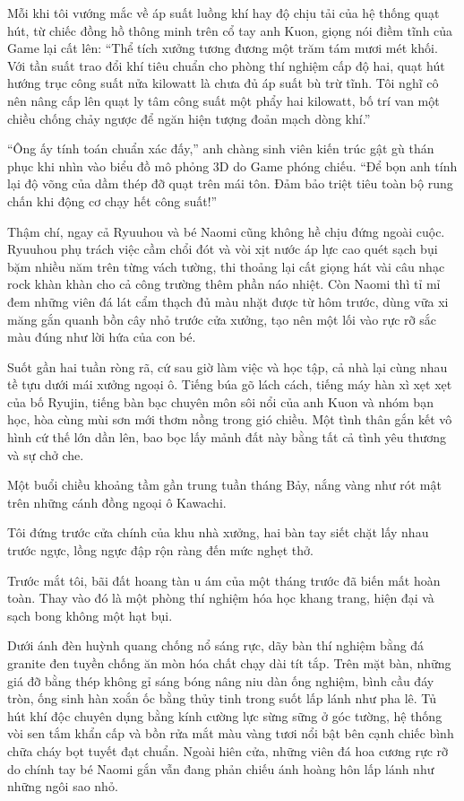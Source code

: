 \documentclass[../main.tex]{subfiles}
\begin{document}
Mỗi khi tôi vướng mắc về áp suất luồng khí hay độ chịu tải của hệ thống quạt hút, từ chiếc đồng hồ thông minh trên cổ tay anh Kuon, giọng nói điềm tĩnh của Game lại cất lên: ``Thể tích xưởng tương đương một trăm tám mươi mét khối. Với tần suất trao đổi khí tiêu chuẩn cho phòng thí nghiệm cấp độ hai, quạt hút hướng trục công suất nửa kilowatt là chưa đủ áp suất bù trừ tĩnh. Tôi nghĩ cô nên nâng cấp lên quạt ly tâm công suất một phẩy hai kilowatt, bố trí van một chiều chống chảy ngược để ngăn hiện tượng đoản mạch dòng khí.''

``Ông ấy tính toán chuẩn xác đấy,'' anh chàng sinh viên kiến trúc gật gù thán phục khi nhìn vào biểu đồ mô phỏng 3D do Game phóng chiếu. ``Để bọn anh tính lại độ võng của dầm thép đỡ quạt trên mái tôn. Đảm bảo triệt tiêu toàn bộ rung chấn khi động cơ chạy hết công suất!''

Thậm chí, ngay cả Ryuuhou và bé Naomi cũng không hề chịu đứng ngoài cuộc. Ryuuhou phụ trách việc cầm chổi đót và vòi xịt nước áp lực cao quét sạch bụi bặm nhiều năm trên từng vách tường, thi thoảng lại cất giọng hát vài câu nhạc rock khàn khàn cho cả công trường thêm phần náo nhiệt. Còn Naomi thì tỉ mỉ đem những viên đá lát cẩm thạch đủ màu nhặt được từ hôm trước, dùng vữa xi măng gắn quanh bồn cây nhỏ trước cửa xưởng, tạo nên một lối vào rực rỡ sắc màu đúng như lời hứa của con bé.

Suốt gần hai tuần ròng rã, cứ sau giờ làm việc và học tập, cả nhà lại cùng nhau tề tựu dưới mái xưởng ngoại ô. Tiếng búa gõ lách cách, tiếng máy hàn xì xẹt xẹt của bố Ryujin, tiếng bàn bạc chuyên môn sôi nổi của anh Kuon và nhóm bạn học, hòa cùng mùi sơn mới thơm nồng trong gió chiều. Một tình thân gắn kết vô hình cứ thế lớn dần lên, bao bọc lấy mảnh đất này bằng tất cả tình yêu thương và sự chở che.

\ct

Một buổi chiều khoảng tầm gần trung tuần tháng Bảy, nắng vàng như rót mật trên những cánh đồng ngoại ô Kawachi.

Tôi đứng trước cửa chính của khu nhà xưởng, hai bàn tay siết chặt lấy nhau trước ngực, lồng ngực đập rộn ràng đến mức nghẹt thở.

Trước mắt tôi, bãi đất hoang tàn u ám của một tháng trước đã biến mất hoàn toàn. Thay vào đó là một phòng thí nghiệm hóa học khang trang, hiện đại và sạch bong không một hạt bụi.

Dưới ánh đèn huỳnh quang chống nổ sáng rực, dãy bàn thí nghiệm bằng đá granite đen tuyền chống ăn mòn hóa chất chạy dài tít tắp. Trên mặt bàn, những giá đỡ bằng thép không gỉ sáng bóng nâng niu dàn ống nghiệm, bình cầu đáy tròn, ống sinh hàn xoắn ốc bằng thủy tinh trong suốt lấp lánh như pha lê. Tủ hút khí độc chuyên dụng bằng kính cường lực sừng sững ở góc tường, hệ thống vòi sen tắm khẩn cấp và bồn rửa mắt màu vàng tươi nổi bật bên cạnh chiếc bình chữa cháy bọt tuyết đạt chuẩn. Ngoài hiên cửa, những viên đá hoa cương rực rỡ do chính tay bé Naomi gắn vẫn đang phản chiếu ánh hoàng hôn lấp lánh như những ngôi sao nhỏ.
\end{document}
